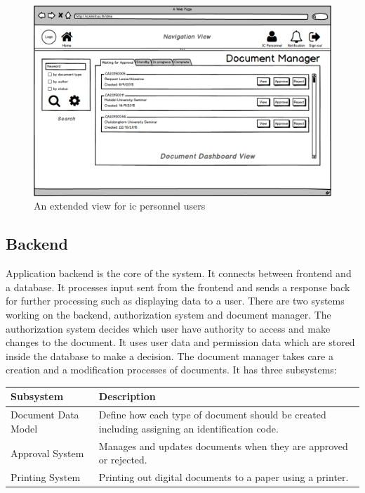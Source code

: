 \begin{figure}[h!]
	\centering
	\caption{An extended view for \gls{ic} personnel users}
	\label{fig:mockup-view-approval}
	\includegraphics[scale=0.35]{res/software-design/view-approval}
\end{figure}

\subsection{Backend}
Application backend is the core of the system.
It connects between frontend and a database.
It processes input sent from the frontend and sends a response back for further processing such as displaying data to a user.
There are two systems working on the backend, authorization system and document manager.
The authorization system decides which user have authority to access and make changes to the document.
It uses user data and permission data which are stored inside the database to make a decision.
The document manager takes care a creation and a modification processes of documents.
It has three subsystems:
\begin{table}
	\centering
	\begin{tabular}{lL{6.5cm}}
		\hline
		Subsystem & Description \\
		\hline
		Document Data Model & Define how each type of document should be created including assigning an identification code. \\
		Approval System & Manages and updates documents when they are approved or rejected. \\
		Printing System & Printing out digital documents to a paper using a printer. \\
		\hline
	\end{tabular}
\end{table}

